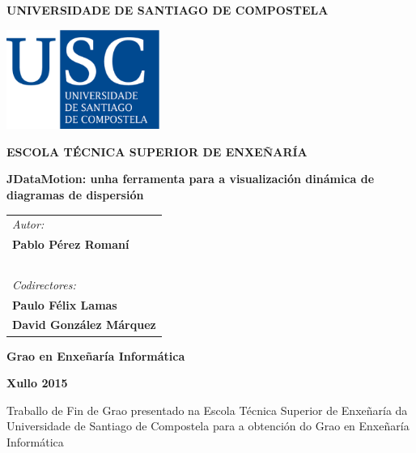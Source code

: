 \pagestyle{empty}
\begin{center}
{\bf\Large UNIVERSIDADE DE SANTIAGO DE COMPOSTELA}

\vspace{0.5cm}
\includegraphics[width=5cm]{figuras/logo_usc.eps}

\vspace{0.5cm}
{\bf\large ESCOLA TÉCNICA SUPERIOR DE ENXEÑARÍA}

\vspace{2cm}
{\bf\LARGE JDataMotion: unha ferramenta para a visualización dinámica de diagramas de dispersión}

\end{center}

\vspace{1cm}
\hspace{3cm}\begin{tabular}{l}
{\it\Large Autor:} \\
{\bf\Large Pablo Pérez Romaní} \\
~ \\
{\it\Large Codirectores:} \\
{\bf\Large Paulo Félix Lamas} \\
{\bf\Large David González Márquez} \\
\end{tabular}

\vspace{1cm}
\begin{center}
{\bf\Large Grao en Enxeñaría Informática}

\vspace{0.5cm}
{\bf\large Xullo 2015}

\vspace{0.5cm}
Traballo de Fin de Grao presentado na Escola Técnica Superior de Enxeñaría da Universidade de Santiago de Compostela para a obtención do Grao en Enxeñaría Informática
\end{center}

